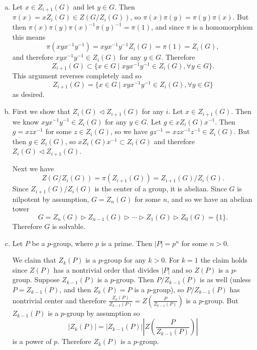 \documentclass{article}
\begin{document}
\begin{Answer}
\begin{enumerate}[(a)]
  \item{
    Let $x \in Z_{i+1}(G)$ and let $y \in G$. Then
    $\pi(x) = x Z_{i}(G) \in Z(G / Z_i(G))$,
    so $\pi(x) \pi(y) = \pi(y) \pi(x)$. But then
    $\pi(x)\pi(y)\pi(x)^{-1}\pi(y)^{-1} = \pi(1)$, and since $\pi$ is
    a homomorphism this means
    $$
      \pi(xyx^{-1}y^{-1})
    = xyx^{-1}y^{-1} Z_i(G)
    = \pi(1)
    = Z_i(G),
    $$
    and therefore $xyx^{-1}y^{-1} \in Z_i(G)$ for any $y \in
    G$. Therefore
    $$
    Z_{i+1}(G) \subset \{ x \in G
                         \mid
                         xyx^{-1}y^{-1} \in Z_i(G), \forall y \in G
                      \}.
    $$
    This argument reverses completely and so
    $$
    Z_{i+1}(G) =\{ x \in G
                  \mid
                  xyx^{-1}y^{-1} \in Z_i(G), \forall y \in G
               \}
    $$
    as desired.
  }
  \item{
    First we show that $Z_{i}(G) \triangleleft Z_{i+1}(G)$ for any
    $i$. Let $x \in Z_{i+1}(G)$. Then we know $xyx^{-1}y^{-1} \in
    Z_i(G)$ for any $y \in G$. Let $g \in x Z_{i}(G) x^{-1}$. Then
    $g = xzx^{-1}$ for some $z \in Z_{i}(G)$, so we have
    $gz^{-1} = xzx^{-1}z^{-1} \in Z_{i}(G)$. But then $g \in
    Z_{i}(G)$, so $x Z_{i}(G) x^{-1} \subset Z_{i}(G)$ and therefore
    $Z_{i}(G) \triangleleft Z_{i+1}(G)$.

    Next we have
    $$
      Z(G / Z_{i}(G))
    = \pi(Z_{i+1}(G))
    = Z_{i+1}(G) / Z_{i}(G).
    $$
    Since $Z_{i+1}(G) / Z_{i}(G)$ is the center of a group, it is
    abelian. Since $G$ is nilpotent by assumption, $G = Z_n(G)$ for
    some $n$, and so we have an abelian tower
    $$
    G = Z_n(G)
    \triangleright Z_{n-1}(G)
    \triangleright \cdots
    \triangleright Z_1(G)
    \triangleright Z_0(G) = \{ 1 \}.
    $$
    Therefore $G$ is solvable.
  }
  \item{
    Let $P$ be a $p$-group, where $p$ is a prime.
    Then $|P| = p^n$ for some $n > 0$.

    We claim that $Z_k(P)$ is a $p$-group for any $k > 0$.
    For $k = 1$ the claim holds since $Z(P)$ has a nontrivial order
    that divides $|P|$ and so $Z(P)$ is a $p$-group.
    Suppose $Z_{k-1}(P)$ is a $p$-group. Then
    $P / Z_{k-1}(P)$ is as well (unless $P = Z_{k-1}(P)$,
    and then $Z_k(P) = P$ is a $p$-group), so $P / Z_{k-1}(P)$ has
    nontrivial center and therefore
    $
      \frac{Z_k(P)}{Z_{k-1}(P)}
    = Z\left(\frac{P}{Z_{k-1}(P)}\right)
    $
    is a $p$-group. But $Z_{k-1}(P)$ is a $p$-group by assumption so
    $$
    |Z_{k}(P)| = |Z_{k-1}(P)|\left|Z\left(\frac{P}{Z_{k-1}(P)}\right)\right|
    $$
    is a power of $p$. Therefore $Z_k(P)$ is a $p$-group.

}
\end{enumerate}
\end{Answer}
\end{document}
